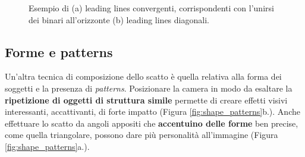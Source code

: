 \vspace{7mm}
\begin{figure}[!h]
    \centering
    \caption{Esempio di (a) leading lines convergenti, corrispondenti con l'unirsi dei binari all'orizzonte (b) leading lines diagonali.}
    \label{fig:diagonal}
\end{figure}

\subsection{Forme e patterns}
Un'altra tecnica di composizione dello scatto è quella relativa alla forma dei soggetti e la presenza di \textit{patterns}. Posizionare la camera in modo da esaltare la \textbf{ripetizione di oggetti di struttura simile} permette di creare effetti visivi interessanti, accattivanti, di forte impatto (Figura \ref{fig:shape_patterns}b.). Anche effettuare lo scatto da angoli appositi che \textbf{accentuino delle forme} ben precise, come quella triangolare, possono dare più personalità all'immagine (Figura \ref{fig:shape_patterns}a.).

